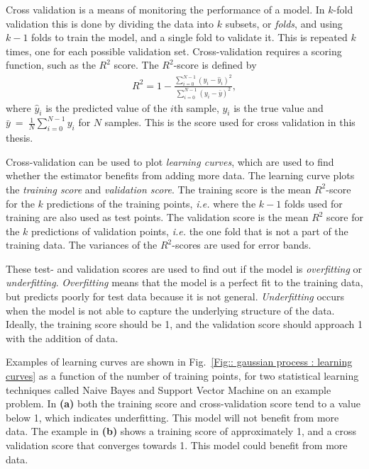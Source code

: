 \documentclass[twoside,english]{uiofysmaster}
\begin{document}
{{Cross validation is a means of monitoring the performance of a model. In $k$-fold validation this is done by dividing the data into $k$ subsets, or \textit{folds}, and using $k-1$ folds to train the model, and a single fold to validate it. This is repeated $k$ times, one for each possible validation set. Cross-validation requires a scoring function, such as the $R^2$ score. The $R^2$-score is defined by 
\begin{align}\label{Eq:: gaussian process : R2-score}
R^2 = 1 - \frac{\sum_{i=0}^{N-1} (y_i - \hat{y}_i)^2}{\sum_{i=0}^{N-1} (y_i - \bar{y})^2},
\end{align}
where $\hat{y}_i$ is the predicted value of the $i$th sample, $y_i$ is the true value and $\bar{y}~=~\frac{1}{N} \sum_{i = 0}^{N-1} y_i$ for $N$ samples. This is the score used for cross validation in this thesis.

Cross-validation can be used to plot \textit{learning curves}, which are used to find whether the estimator benefits from adding more data. The learning curve plots the \textit{training score} and \textit{validation score}. The training score is the mean $R^2$-score for the $k$ predictions of the training points, \textit{i.e.} where the $k-1$ folds used for training are also used as test points. The validation score is the mean $R^2$ score for the $k$ predictions of validation points, \textit{i.e.} the one fold that is not a part of the training data. The variances of the $R^2$-scores are used for error bands.

These test- and validation scores are used to find out if the model is \textit{overfitting} or \textit{underfitting}. \textit{Overfitting} means that the model is a perfect fit to the training data, but predicts poorly for test data because it is not general. \textit{Underfitting} occurs when the model is not able to capture the underlying structure of the data. Ideally, the training score should be 1, and the validation score should approach 1 with the addition of data.

Examples of learning curves are shown in Fig.~\ref{Fig:: gaussian process : learning curves} as a function of the number of training points, for two statistical learning techniques called Naive Bayes and Support Vector Machine on an example problem. In \textbf{(a)} both the training score and cross-validation score tend to a value below 1, which indicates underfitting. This model will not benefit from more data. The example in \textbf{(b)} shows a training score of approximately 1, and a cross validation score that converges towards 1. This model could benefit from more data.

}}
\end{document}
